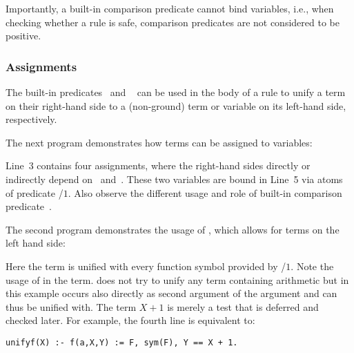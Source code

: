 Importantly, a built-in comparison predicate cannot bind variables, i.e.,
when checking whether a rule is safe, 
comparison predicates are not considered to be positive.


\subsubsection{Assignments}\label{subsec:gringo:assign}

The built-in predicates~\code{:=} and ~\code{=} can be used in the body of a rule
to unify a term on their right-hand side 
to a (non-ground) term or variable on its left-hand side, respectively.

\begin{example}\label{ex:assign}
The next program demonstrates how terms can be assigned to variables:%
%
%

%
Line~3 contains four assignments, where the right-hand sides directly or indirectly
depend on~ and~.
These two variables are bound in Line~5 via atoms of predicate /$1$.
Also observe the different usage and role of built-in comparison predicate~\code{==}.
\eexample
\end{example}

\begin{example}\label{ex:unify}
The second program demonstrates the usage of \code{:=},
which allows for terms on the left hand side:
%
%

%
Here the term  is unified with every function symbol provided by /$1$.
Note the usage of  in the term.
\gringo{} does not try to unify any term containing arithmetic 
but in this example  occurs also directly as second argument of the argument
and can thus be unified with.
The term $X+1$ is merely a test that is deferred and checked later.
For example, the fourth line is equivalent to:
\begin{lstlisting}[firstnumber=6]
unifyf(X) :- f(a,X,Y) := F, sym(F), Y == X + 1.
\end{lstlisting}%
\eexample
\end{example}

